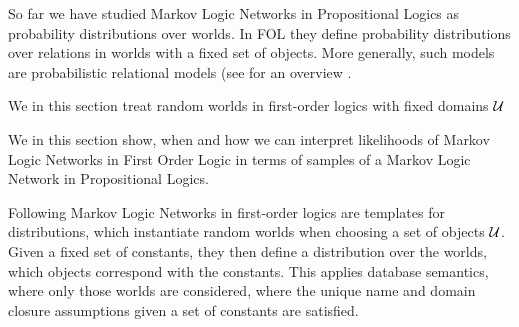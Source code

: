 







So far we have studied Markov Logic Networks in Propositional Logics as probability distributions over worlds.
In FOL they define probability distributions over relations in worlds with a fixed set of objects.
More generally, such models are probabilistic relational models (see for an overview \cite{getoor_introduction_2019}.


We in this section treat random worlds in first-order logics with fixed domains $\mathcal{U}$

%
We in this section show, when and how we can interpret likelihoods of Markov Logic Networks in First Order Logic in terms of samples of a Markov Logic Network in Propositional Logics.


Following \cite{richardson_markov_2006} Markov Logic Networks in first-order logics are templates for distributions, which instantiate random worlds when choosing a set of objects $\mathcal{U}$.
Given a fixed set of constants, they then define a distribution over the worlds, which objects correspond with the constants. %
This applies database semantics, where only those worlds are considered, where the unique name and domain closure assumptions given a set of constants are satisfied.

